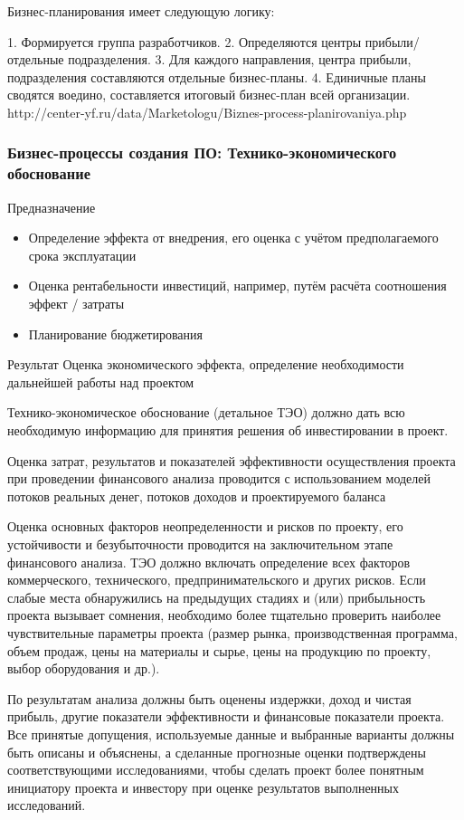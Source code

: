 \documentclass{../industrial-development}
\begin{document}
Бизнес-планирования имеет следующую логику:

1. Формируется группа разработчиков.
2. Определяются центры прибыли/отдельные подразделения.
3. Для каждого направления, центра прибыли, подразделения составляются отдельные бизнес-планы.
4. Единичные планы сводятся воедино, составляется итоговый бизнес-план всей организации. 
http://center-yf.ru/data/Marketologu/Biznes-process-planirovaniya.php

\begin{frame} \frametitle{Бизнес-процессы создания ПО: Технико-экономического обоснование}
	\begin{block}{Предназначение}
		\begin{itemize}
			\item Определение эффекта от внедрения, его оценка с учётом предполагаемого срока эксплуатации
			\item Оценка рентабельности инвестиций, например, путём расчёта соотношения эффект / затраты
			\item Планирование бюджетирования
		\end{itemize}
	\end{block}
	\begin{block}{Результат}
		Оценка экономического эффекта, определение необходимости дальнейшей работы над проектом
	\end{block}
\end{frame}
\lecturenotes
Технико-экономическое обоснование (детальное ТЭО) должно дать всю необходимую информацию для принятия решения об инвестировании в проект. 

Оценка затрат, результатов и показателей эффективности осуществления проекта при проведении финансового анализа проводится с использованием моделей потоков реальных денег, потоков доходов и проектируемого баланса

Оценка основных факторов неопределенности и рисков по проекту, его устойчивости и безубыточности проводится на заключительном этапе финансового анализа.
ТЭО должно включать определение всех факторов коммерческого, технического, предпринимательского и других рисков.
Если слабые места обнаружились на предыдущих стадиях и (или) прибыльность проекта вызывает сомнения, необходимо более тщательно проверить наиболее чувствительные параметры проекта (размер рынка, производственная программа, объем продаж, цены на материалы и сырье, цены на продукцию по проекту, выбор оборудования и др.).

По результатам анализа должны быть оценены издержки, доход и чистая прибыль, другие показатели эффективности и финансовые показатели проекта.
Все принятые допущения, используемые данные и выбранные варианты должны быть описаны и объяснены, а сделанные прогнозные оценки подтверждены соответствующими исследованиями, чтобы сделать проект более понятным инициатору проекта и инвестору при оценке результатов выполненных исследований. 
\end{document}
